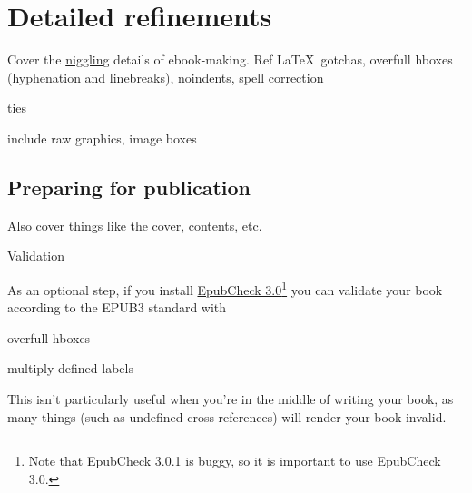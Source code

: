 \chapter{Detailed refinements} %
\label{cha:detailed_refinements}

Cover the \href{http://www.thefreedictionary.com/niggling}{niggling} details of ebook-making. Ref \LaTeX\ gotchas, overfull hboxes (hyphenation and linebreaks), noindents, spell correction

ties

include raw graphics, image boxes

\section{Preparing for publication} %
\label{sec:preparing_for_publication}

Also cover things like the cover,  contents, etc.

Validation

As an optional step, if you install \href{https://github.com/IDPF/epubcheck/releases/download/v3.0/epubcheck-3.0.zip}{EpubCheck 3.0}\footnote{Note that EpubCheck 3.0.1 is buggy, so it is important to use EpubCheck 3.0.} you can validate your book according to the EPUB3 standard with

overfull hboxes

multiply defined labels








\noindent This isn't particularly useful when you're in the middle of writing your book, as many things (such as undefined cross-references) will render your book invalid.



